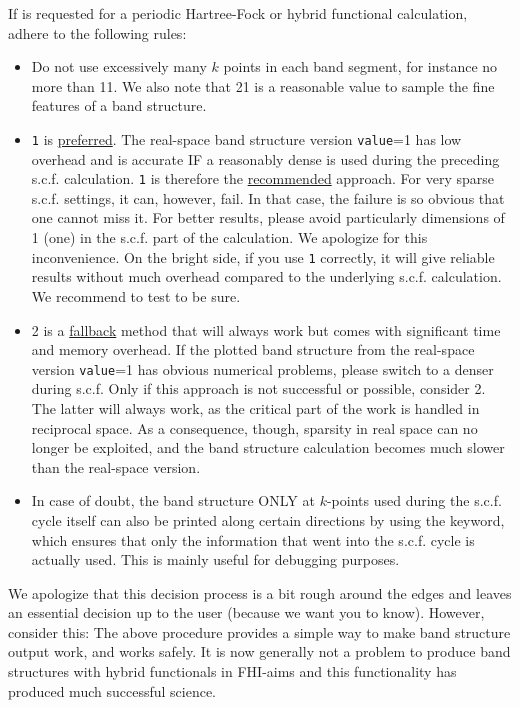 If   is requested for a periodic Hartree-Fock
or hybrid functional calculation, adhere to the following rules:
\begin{itemize}
  \item Do not use excessively many $k$ points in each band segment,
    for instance no more than 11. We also note that 21 is a reasonable value 
    to sample the fine features of a band structure.
  \item {}
    \texttt{1} is \underline{preferred}. The real-space band structure
    version \texttt{value}=1 has low overhead and is
    accurate IF a reasonably dense  is used
    during the preceding
    s.c.f. calculation.  
    \texttt{1} is therefore the \underline{recommended} approach. For
    very sparse s.c.f.  settings, it can, however,
    fail. In that case, the failure is so obvious that one cannot miss
    it. For better results, please avoid particularly
     dimensions of 1 (one) in the s.c.f. part of the
    calculation. We apologize for this inconvenience. On the bright
    side, if you use 
    \texttt{1} correctly, it will give reliable results without much
    overhead compared to the underlying s.c.f. calculation.
    We recommend to test to be sure.
  \item {} 2 is a
    \underline{fallback} method that will always work but comes with
    significant time and memory overhead. 
    If the plotted band structure from the real-space version
     \texttt{value}=1 has
    obvious numerical problems, please switch to 
    a denser  during s.c.f. Only if this
    approach is not successful or possible, consider
     2. The latter will always
    work, as the critical part of the work is handled in reciprocal
    space. As a consequence, though, sparsity in real space can no
    longer be exploited, and the band structure calculation becomes
    much slower than the real-space version.
  \item In case of doubt, the band structure ONLY at $k$-points used
    during the s.c.f. cycle itself can also be printed along certain
    directions by using the  
     keyword, which ensures that
    only the information that went into the s.c.f. cycle is actually
    used. This is mainly useful for debugging purposes.
\end{itemize}
We apologize that this decision process is a bit rough around
the edges and leaves an essential decision up to the user (because we
want you to know). However, consider this: The above
procedure provides a simple way to make band structure output work,
and works safely. It is now generally not a problem to produce band 
structures with hybrid functionals in FHI-aims and this functionality
has produced much successful science. 

